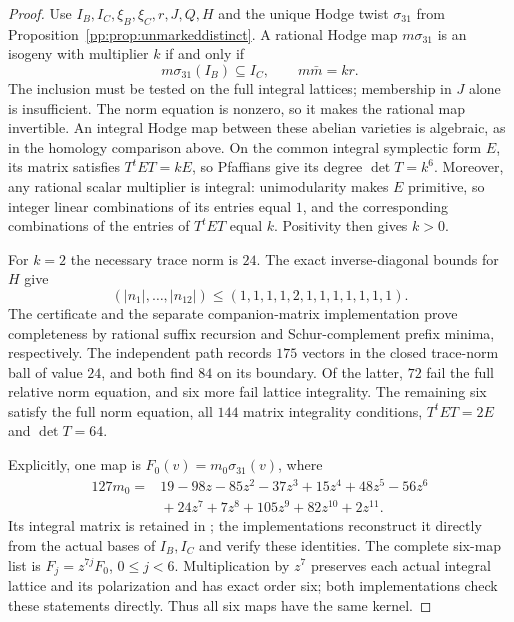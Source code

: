 \begin{proof}
Use $I_B,I_C,\xi_B,\xi_C,r,J,Q,H$ and the unique Hodge twist
$\sigma_{31}$ from Proposition~\ref{pp:prop:unmarkeddistinct}.
A rational Hodge map $m\sigma_{31}$ is an isogeny with multiplier $k$
if and only if
\[
 m\sigma_{31}(I_B)\subseteq I_C,\qquad m\bar m=kr.
\]
The inclusion must be tested on the full integral lattices; membership
in $J$ alone is insufficient. The norm equation is nonzero, so it makes
the rational map invertible. An integral Hodge map between these
abelian varieties is algebraic, as in the homology comparison above.
On the common integral symplectic form $E$, its matrix satisfies
$T^tET=kE$, so Pfaffians give its degree $\det T=k^6$.
Moreover, any rational scalar multiplier is integral: unimodularity
makes $E$ primitive, so integer linear combinations of its entries
equal $1$, and the corresponding combinations of the entries of
$T^tET$ equal $k$. Positivity then gives $k>0$.

For $k=2$ the necessary trace norm is $24$. The exact inverse-diagonal
bounds for $H$ give
\[
 (|n_1|,\ldots,|n_{12}|)\leq(1,1,1,1,2,1,1,1,1,1,1,1).
\]
The certificate 
and the separate companion-matrix implementation
 prove completeness
by rational suffix recursion and Schur-complement prefix minima,
respectively. The independent path records $175$ vectors in the closed
trace-norm ball of value $24$, and both find $84$ on its boundary.
Of the latter, $72$ fail the
full relative norm equation, and six more fail lattice integrality.
The remaining six satisfy the full norm equation, all $144$ matrix
integrality conditions, $T^tET=2E$ and $\det T=64$.

Explicitly, one map is $F_0(v)=m_0\sigma_{31}(v)$, where
\[
\begin{split}
127m_0={}&19-98z-85z^2-37z^3+15z^4+48z^5-56z^6\\
        &{}+24z^7+7z^8+105z^9+82z^{10}+2z^{11}.
\end{split}
\]
Its integral matrix is retained in
; the implementations
reconstruct it directly from the actual bases of $I_B,I_C$ and verify
these identities. The complete six-map list is
$F_j=z^{7j}F_0$, $0\leq j<6$. Multiplication by $z^7$ preserves each
actual integral lattice and its polarization and has exact order six;
both implementations check these statements directly.
Thus all six maps have the same kernel.


\end{proof}
